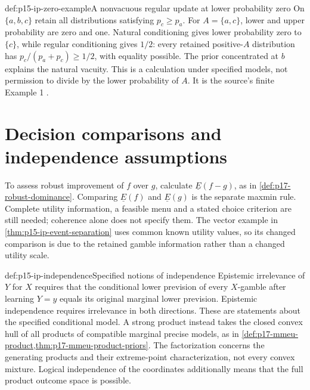 \begin{hbexample}{def:p15-ip-zero-example}{A nonvacuous regular update at lower probability zero}
On \(\{a,b,c\}\) retain all distributions satisfying \(p_c\geq p_a\).
For \(A=\{a,c\}\), lower and upper probability are zero and one.
Natural conditioning gives lower probability zero to \(\{c\}\),
while regular conditioning gives \(1/2\): every retained positive-\(A\)
distribution has \(p_c/(p_a+p_c)\geq1/2\), with equality possible.
The prior concentrated at \(b\) explains the natural vacuity.
This is a calculation under specified models, not permission to divide
by the lower probability of \(A\).
It is the source's finite Example 1
\cite[author preprint, p.~2]{DeBockDeCooman2015ConditioningPreprint}.
\end{hbexample}

\section{Decision comparisons and independence assumptions}
\label{sec:p15-ip-decision-independence}

To assess robust improvement of \(f\) over \(g\), calculate
\(\underline E(f-g)\), as in \cref{def:p17-robust-dominance}.
Comparing \(\underline E(f)\) and \(\underline E(g)\) is the separate
maxmin rule. Complete utility information, a feasible menu and a stated
choice criterion are still needed; coherence alone does not specify them.
The vector example in \cref{thm:p15-ip-event-separation} uses common
known utility values, so its changed comparison is due to the retained
gamble information rather than a changed utility scale.

\begin{hbdefinition}{def:p15-ip-independence}{Specified notions of independence}
Epistemic irrelevance of \(Y\) for \(X\) requires that the conditional
lower prevision of every \(X\)-gamble after learning \(Y=y\) equals
its original marginal lower prevision. Epistemic independence requires
irrelevance in both directions. These are statements about the specified
conditional model. A strong product instead takes the closed convex hull
of all products of compatible marginal precise models, as in
\cref{def:p17-mmeu-product,thm:p17-mmeu-product-priors}.
The factorization concerns the generating products and their extreme-point
characterization, not every convex mixture. Logical independence of the
coordinates additionally means that the full product outcome space is
possible.
\end{hbdefinition}

